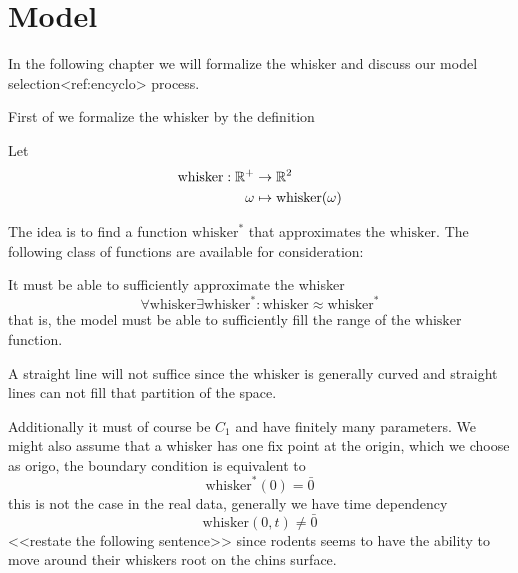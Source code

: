 \section{Model}


In the following chapter we will formalize the whisker and discuss our model
selection<ref:encyclo> process.

First of we formalize the whisker by the definition

\begin{definition}
    Let 
    \begin{equation}
    \begin{split}
        \text{whisker} : \mathbb{R}^+ &\rightarrow \mathbb{R}^2 \\
                  \omega&\mapsto \text{whisker}(\omega)
    \end{split}
    \end{equation}
\end{definition}

The idea is to find a function $\text{whisker}^*$ that approximates the $\text{whisker}$. The 
following class of functions are available for consideration:

It must be able to sufficiently approximate the whisker
\begin{equation}
    \forall \text{whisker} \exists \text{whisker}^* : \text{whisker} \approx \text{whisker}^*
\end{equation}
that is, the model must be able to sufficiently fill the range of the $\text{whisker}$ function.

\begin{example}
    A straight line will not suffice since the $\text{whisker}$ is generally
    curved and straight lines can not fill that partition of the space.
\end{example}

Additionally it must of course be $C_1$ and have finitely many parameters.
We might also assume that a whisker has one fix point at the origin, which we
choose as origo, the boundary condition is equivalent to
\begin{equation}
    \label{eq:bv_root}
    \text{whisker}^*(0)=\bar{0}
\end{equation}
this is not the case in the real data, generally we have time dependency
\begin{equation}
    \text{whisker}(0,t)\neq\bar{0} 
\end{equation}
<<restate the following sentence>>
since rodents seems to have the ability to move around their whiskers root on
the chins surface.

